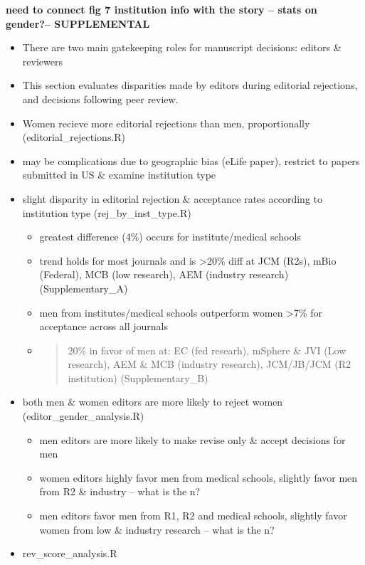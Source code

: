 \documentclass[11pt,]{article}
\providecommand{\tightlist}{%
  \setlength{\itemsep}{0pt}\setlength{\parskip}{0pt}}
\begin{document}
\textbf{need to connect fig 7 institution info with the story -- stats
on gender?-- SUPPLEMENTAL}

\begin{itemize}
\tightlist
\item
  There are two main gatekeeping roles for manuscript decisions: editors
  \& reviewers
\item
  This section evaluates disparities made by editors during editorial
  rejections, and decisions following peer review.
\item
  Women recieve more editorial rejections than men, proportionally
  (editorial\_rejections.R)
\item
  may be complications due to geographic bias (eLife paper), restrict to
  papers submitted in US \& examine institution type
\item
  slight disparity in editorial rejection \& acceptance rates according
  to institution type (rej\_by\_inst\_type.R)

  \begin{itemize}
  \item
    greatest difference (4\%) occurs for institute/medical schools
  \item
    trend holds for most journals and is \textgreater{}20\% diff at JCM
    (R2s), mBio (Federal), MCB (low research), AEM (industry research)
    (Supplementary\_A)
  \item
    men from institutes/medical schools outperform women
    \textgreater{}7\% for acceptance across all journals
  \item
    \begin{quote}
    20\% in favor of men at: EC (fed researh), mSphere \& JVI (Low
    research), AEM \& MCB (industry research), JCM/JB/JCM (R2
    institution) (Supplementary\_B)
    \end{quote}
  \end{itemize}
\item
  both men \& women editors are more likely to reject women
  (editor\_gender\_analysis.R)

  \begin{itemize}
  \tightlist
  \item
    men editors are more likely to make revise only \& accept decisions
    for men
  \item
    women editors highly favor men from medical schools, slightly favor
    men from R2 \& industry -- what is the n?
  \item
    men editors favor men from R1, R2 and medical schools, slightly
    favor women from low \& industry research -- what is the n?
  \end{itemize}
\item
  rev\_score\_analysis.R


\end{itemize}
\end{document}
